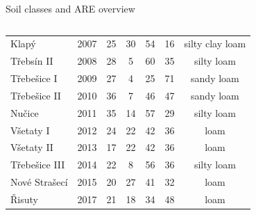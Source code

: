 \begin{block}{Soil classes and ARE overview}
\begin{columns}
\begin{column}{0.6\textwidth}
\begin{table}[]
\begin{tabular}{lcccccc}
        Klapý         & 2007    & 25                & 30             & 54            & 16            & silty clay loam \\
        Třebsín II    & 2008    & 28                & 5              & 60            & 35            & silty loam      \\
        Třebešice I   & 2009    & 27                & 4              & 25            & 71            & sandy loam      \\
        Třebešice II  & 2010    & 36                & 7              & 46            & 47            & sandy loam      \\
        Nučice        & 2011    & 35                & 14             & 57            & 29            & silty loam      \\
        Všetaty I     & 2012    & 24                & 22             & 42            & 36            & loam            \\
        Všetaty II    & 2013    & 17                & 22             & 42            & 36            & loam            \\
        Třebešice III & 2014    & 22                & 8              & 56            & 36            & silty loam      \\
        Nové Strašecí & 2015    & 20                & 27             & 41            & 32            & loam            \\
        Řisuty        & 2017    & 21                & 18             & 34            & 48            & loam           \\
        \hline
        \hline
        \end{tabular}
        \end{table}
    \end{column}
\end{columns}


\end{block}








        
